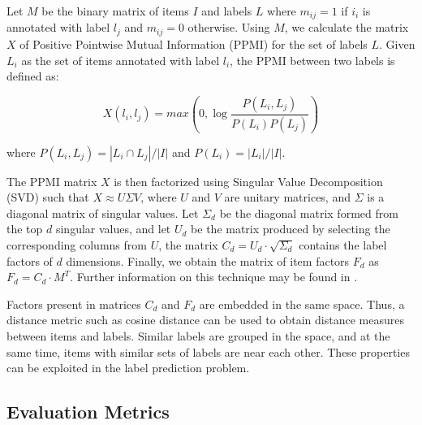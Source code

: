 Let $M$ be the binary matrix of items $I$ and labels $L$ where $m_{ij} = 1$ if $i_i$ is annotated with label $l_j$ and $m_{ij} = 0$ otherwise. Using $M$, we calculate the matrix $X$ of Positive Pointwise Mutual Information (PPMI) for the set of labels $L$. Given $L_i$ as the set of items annotated with label $l_i$, the PPMI between two labels is defined as:

\begin{equation}
X(l_i,l_j) =
max\left(0,\log{\frac{P(L_i,L_j)
  }{
    P(L_i)P(L_j)
  }}\right)
\end{equation}

where $P(L_i,L_j) = |L_i \cap L_j| / |I|$ and $P(L_i) = |L_i| / |I|$.

The PPMI matrix $X$ is then factorized using Singular Value Decomposition (SVD) such that $X \approx U \Sigma V$, where $U$ and $V$ are unitary matrices, and $\Sigma$ is a diagonal matrix of singular values. Let $\Sigma_d$ be the diagonal matrix formed from the top $d$ singular values, and let $U_d$ be the matrix produced by selecting the corresponding columns from $U$, the matrix $C_d = U_d \cdot \sqrt{\Sigma_d}$ contains the label factors of $d$ dimensions. Finally, we obtain the matrix of item factors $F_d$ as $F_d = C_d \cdot M^T$. Further information on this technique may be found in \cite{levy2014neural}.

Factors present in matrices $C_d$ and $F_d$ are embedded in the same space. Thus, a distance metric such as cosine distance can be used to obtain distance measures between items and labels. Similar labels are grouped in the space, and at the same time, items with similar sets of labels are near each other. These properties can be exploited in the label prediction problem.


\subsection{Evaluation Metrics}\label{sec:multi-class:metrics}

